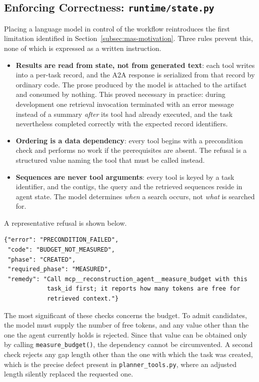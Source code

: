 \subsection{Enforcing Correctness: \texttt{runtime/state.py}}
\label{subsec:mas-state}

Placing a language model in control of the workflow reintroduces the first limitation
identified in Section~\ref{subsec:mas-motivation}. Three rules prevent this, none of which is
expressed as a written instruction.

\begin{itemize}
    \item \textbf{Results are read from state, not from generated text}: each tool writes into
    a per-task record, and the A2A response is serialized from that record by ordinary code.
    The prose produced by the model is attached to the artifact and consumed by nothing. This
    proved necessary in practice: during development one retrieval invocation terminated with
    an error message instead of a summary \textit{after} its tool had already executed, and the
    task nevertheless completed correctly with the expected record identifiers.

    \item \textbf{Ordering is a data dependency}: every tool begins with a precondition check
    and performs no work if the prerequisites are absent. The refusal is a structured value
    naming the tool that must be called instead.

    \item \textbf{Sequences are never tool arguments}: every tool is keyed by a task
    identifier, and the contigs, the query and the retrieved sequences reside in agent state.
    The model determines \textit{when} a search occurs, not \textit{what} is searched for.
\end{itemize}

A representative refusal is shown below.

\begin{verbatim}
{"error": "PRECONDITION_FAILED",
 "code": "BUDGET_NOT_MEASURED",
 "phase": "CREATED",
 "required_phase": "MEASURED",
 "remedy": "Call mcp__reconstruction_agent__measure_budget with this
            task_id first; it reports how many tokens are free for
            retrieved context."}
\end{verbatim}

The most significant of these checks concerns the budget. To admit candidates, the model must
supply the number of free tokens, and any value other than the one the agent currently holds
is rejected. Since that value can be obtained only by calling \texttt{measure\_budget()}, the
dependency cannot be circumvented. A second check rejects any gap length other than the one
with which the task was created, which is the precise defect present in
\texttt{planner\_tools.py}, where an adjusted length silently replaced the requested one.


